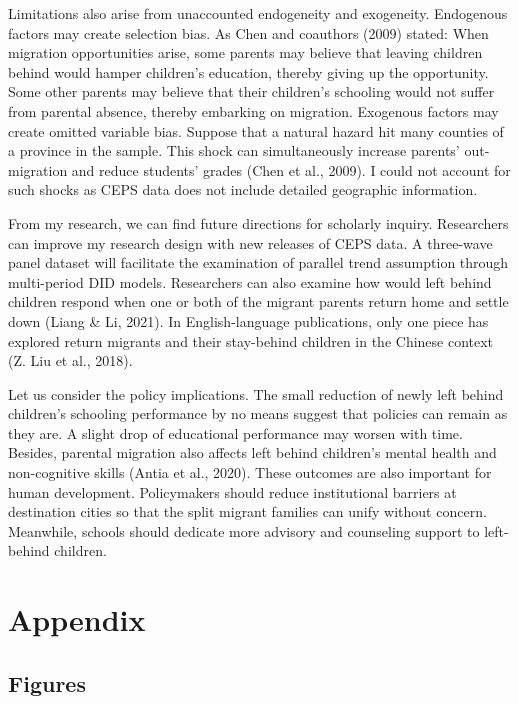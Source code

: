\documentclass[
  man,floatsintext]{apa7}
\begin{document}
Limitations also arise from unaccounted endogeneity and exogeneity. Endogenous factors may create selection bias. As Chen and coauthors (2009) stated: When migration opportunities arise, some parents may believe that leaving children behind would hamper children's education, thereby giving up the opportunity. Some other parents may believe that their children's schooling would not suffer from parental absence, thereby embarking on migration. Exogenous factors may create omitted variable bias. Suppose that a natural hazard hit many counties of a province in the sample. This shock can simultaneously increase parents' out-migration and reduce students' grades (Chen et al., 2009). I could not account for such shocks as CEPS data does not include detailed geographic information.

From my research, we can find future directions for scholarly inquiry. Researchers can improve my research design with new releases of CEPS data. A three-wave panel dataset will facilitate the examination of parallel trend assumption through multi-period DID models. Researchers can also examine how would left behind children respond when one or both of the migrant parents return home and settle down (Liang \& Li, 2021). In English-language publications, only one piece has explored return migrants and their stay-behind children in the Chinese context (Z. Liu et al., 2018).

Let us consider the policy implications. The small reduction of newly left behind children's schooling performance by no means suggest that policies can remain as they are. A slight drop of educational performance may worsen with time. Besides, parental migration also affects left behind children's mental health and non-cognitive skills (Antia et al., 2020). These outcomes are also important for human development. Policymakers should reduce institutional barriers at destination cities so that the split migrant families can unify without concern. Meanwhile, schools should dedicate more advisory and counseling support to left-behind children.

\newpage

\hypertarget{appendix}{%
\section{Appendix}\label{appendix}}

\hypertarget{figures}{%
\subsection{Figures}\label{figures}}
\end{document}
